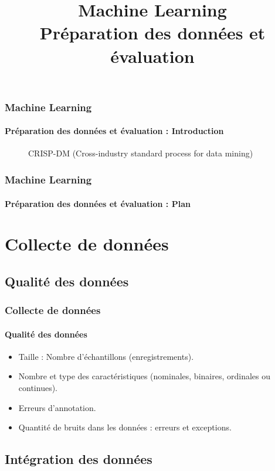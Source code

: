 \documentclass[xcolor=table]{beamer}
\title[ML : Préparation des données et évaluation] %
{Machine Learning \\Préparation des données et évaluation}
\begin{document}
	
\begin{frame}
	\frametitle{Machine Learning}
	\framesubtitle{Préparation des données et évaluation : Introduction}
	
	\begin{figure}
		\centering
		\caption{CRISP-DM (Cross-industry standard process for data mining)}
	\end{figure}
	
\end{frame}


\begin{frame}
	\frametitle{Machine Learning}
	\framesubtitle{Préparation des données et évaluation : Plan}
	
	\begin{multicols}{2}
		\tableofcontents
	\end{multicols}
\end{frame}

\section{Collecte de données}

\subsection{Qualité des données}

\begin{frame}
\frametitle{Collecte de données}
\framesubtitle{Qualité des données}

\begin{itemize}
	\item Taille : Nombre d'échantillons (enregistrements).
	\item Nombre et type des caractéristiques (nominales, binaires, ordinales ou continues).
	\item Erreurs d'annotation.
	\item Quantité de bruits dans les données : erreurs et exceptions.
\end{itemize}

\end{frame}


\subsection{Intégration des données}
\end{document}

